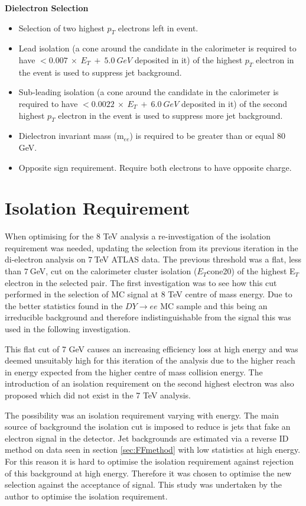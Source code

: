 {\bf Dielectron Selection}
\begin{itemize}
\item Selection of two highest $p_{T}$ electrons left in event.
\item Lead isolation (a cone around the candidate in the calorimeter is required to have  $< 0.007~\times~E_{T}~+~5.0~GeV$ deposited in it) of the highest $p_{T}$ electron in the event is used to suppress jet background. 
\item Sub-leading isolation (a cone around the candidate in the calorimeter is required to have  $< 0.0022~\times~E_{T}~+~6.0~GeV$ deposited in it) of the second highest $p_{T}$ electron in the event is used to suppress more jet background. 
\item Dielectron invariant mass (m$_{ee}$) is required to be greater than or equal 80 GeV.
\item Opposite sign requirement. Require both electrons to have opposite charge.
\end{itemize}




\section{Isolation Requirement}
   \label{sec:iso}

When optimising for the 8 TeV analysis a re-investigation of the isolation requirement was needed, updating the selection from its previous iteration in the di-electron analysis on $7~$TeV ATLAS data. The previous threshold was a flat, less than $7~$GeV, cut on the calorimeter cluster isolation ($E_{T}$cone20) of the highest E$_{T}$ electron in the selected pair. The first investigation was to see how this cut performed in the selection of MC signal at 8 TeV centre of mass energy. Due to the better statistics found in the $DY{\rightarrow}ee$ MC sample and this being an irreducible background and therefore indistinguishable from the signal this was used in the following investigation.

This flat cut of 7 GeV causes an increasing efficiency loss at high energy and was deemed unsuitably high for this iteration of the analysis due to the higher reach in energy expected from the higher centre of mass collision energy. The introduction of an isolation requirement on the second highest electron was also proposed which did not exist in the 7 TeV analysis.

The possibility was an isolation requirement varying with energy. The main source of background the isolation cut is imposed to reduce is jets that fake an electron signal in the detector. Jet backgrounds are estimated via a reverse ID method on data seen in section \ref{sec:FFmethod} with low statistics at high energy. For this reason it is hard to optimise the isolation requirement against rejection of this background at high energy. Therefore it was chosen to optimise the new selection against the acceptance of signal. This study was undertaken by the author to optimise the isolation requirement. 

